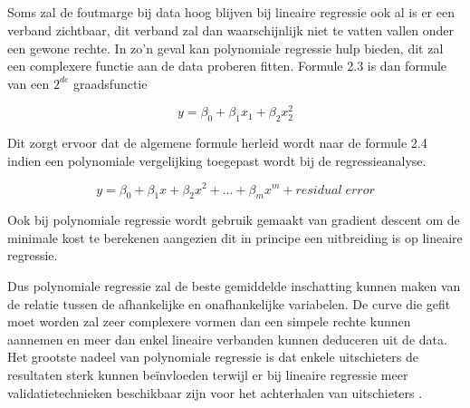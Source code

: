 
\subsection{}

Soms zal de foutmarge bij data hoog blijven bij lineaire regressie ook al is er een verband zichtbaar, dit verband zal dan waarschijnlijk niet te vatten vallen onder een gewone rechte. In zo'n geval kan polynomiale regressie hulp bieden, dit zal een complexere functie aan de data proberen fitten. Formule 2.3 is dan formule van een $2^{de}$ graadsfunctie 

\begin{equation}
y = \beta_0 + \beta_1 x_1  + \beta_2 x_2^2 
\end{equation}

Dit zorgt ervoor dat de algemene formule herleid wordt naar de formule 2.4 indien een polynomiale vergelijking toegepast wordt bij de regressieanalyse.

\begin{equation}
y = \beta_0 + \beta_1 x  + \beta_2 x^2 + ... + \beta_m x^m + residual\;error
\end{equation}

Ook bij polynomiale regressie wordt gebruik gemaakt van gradient descent om de minimale kost te berekenen aangezien dit in principe een uitbreiding is op lineaire regressie. 

Dus polynomiale regressie zal de beste gemiddelde inschatting kunnen maken van de relatie tussen de afhankelijke en onafhankelijke variabelen. De curve die gefit moet worden zal zeer complexere vormen dan een simpele rechte kunnen aannemen en meer dan enkel lineaire verbanden kunnen deduceren uit de data. Het grootste nadeel van polynomiale regressie is dat enkele uitschieters de resultaten sterk kunnen be\"{i}nvloeden terwijl er bij lineaire regressie meer validatietechnieken beschikbaar zijn voor het achterhalen van uitschieters \autocite{Pant2019}. 



\subsection{}


